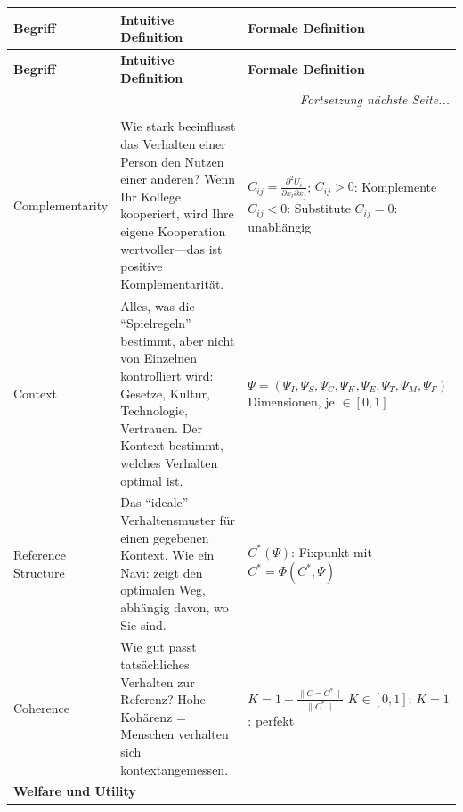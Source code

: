 \begin{center}
\small
\renewcommand{\arraystretch}{1.5}
\begin{longtable}{@{}p{2.5cm}p{5.2cm}p{5.2cm}@{}}
\toprule
\textbf{Begriff} & \textbf{Intuitive Definition} & \textbf{Formale Definition} \\
\midrule
\endfirsthead
\toprule
\textbf{Begriff} & \textbf{Intuitive Definition} & \textbf{Formale Definition} \\
\midrule
\endhead
\midrule
\multicolumn{3}{r}{\textit{Fortsetzung nächste Seite...}} \\
\bottomrule
\endfoot
\bottomrule
\endlastfoot

\multicolumn{3}{l}{\cellcolor{blue!10}\textbf{Kernkonzepte (Core Concepts)}} \\
\midrule

Complementarity &
Wie stark beeinflusst das Verhalten einer Person den Nutzen einer anderen? Wenn Ihr Kollege kooperiert, wird Ihre eigene Kooperation wertvoller---das ist positive Komplementarität. &
$C_{ij} = \frac{\partial^2 U_i}{\partial x_i \partial x_j}$; \newline $C_{ij} > 0$: Komplemente \newline $C_{ij} < 0$: Substitute \newline $C_{ij} = 0$: unabhängig \\

Context &
Alles, was die ``Spielregeln'' bestimmt, aber nicht von Einzelnen kontrolliert wird: Gesetze, Kultur, Technologie, Vertrauen. Der Kontext bestimmt, welches Verhalten optimal ist. &
$\Psi = (\Psi_I, \Psi_S, \Psi_C, \Psi_K, \Psi_E, \Psi_T, \Psi_M, \Psi_F)$ \newline 8 Dimensionen, je $\in [0,1]$ \\

Reference Structure &
Das ``ideale'' Verhaltensmuster für einen gegebenen Kontext. Wie ein Navi: zeigt den optimalen Weg, abhängig davon, wo Sie sind. &
$C^*(\Psi)$: Fixpunkt mit \newline $C^* = \Phi(C^*, \Psi)$ \\

Coherence &
Wie gut passt tatsächliches Verhalten zur Referenz? Hohe Kohärenz = Menschen verhalten sich kontextangemessen. &
$K = 1 - \frac{\|C - C^*\|}{\|C^*\|}$ \newline $K \in [0,1]$; $K=1$: perfekt \\

\midrule
\multicolumn{3}{l}{\cellcolor{green!10}\textbf{Welfare und Utility}} \\
\midrule


\end{longtable}
\end{center}
